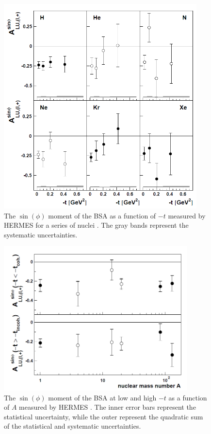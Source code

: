 \documentclass[aps,prc,preprint,superscriptaddress]{revtex4}
\begin{document}
\begin{figure}[tbp!]
\center
	\includegraphics[width=10.5cm]{HERMES_BSA.png}
	\caption{The $\sin(\phi)$ moment of the BSA as a function of $-t$ measured by HERMES
	for a series of nuclei \cite{Airapetian:2009cga}. The gray bands represent the systematic 
        uncertainties.}
\label{fig:HERMES1}
\end{figure}

\begin{figure}[tbp!]
\center
\includegraphics[width=10cm]{HERMES_BSA_2.png}
\caption{The $\sin(\phi)$ moment of the BSA at low and high $-t$ as a function of $A$ measured by HERMES
	\cite{Airapetian:2009cga}. The inner error bars represent the statistical uncertainty, while 
the outer represent the quadratic sum of the statistical and systematic uncertainties.}
\label{fig:HERMES2}
\end{figure}
\end{document}
